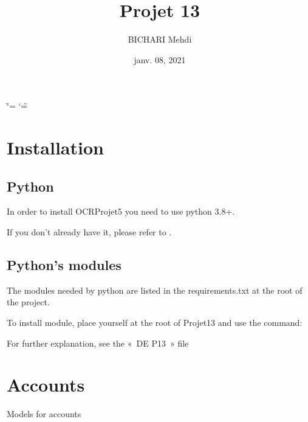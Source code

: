 \documentclass[letterpaper,10pt,french]{sphinxmanual}
\title{Projet 13}
\date{janv. 08, 2021}
\author{BICHARI Mehdi}
\begin{document}
\ifdefined\shorthandoff
  \ifnum\catcode`\=\string=\active\shorthandoff{=}\fi
  \ifnum\catcode`\"=\active{}\fi
\fi

\pagestyle{empty}
\sphinxmaketitle
\pagestyle{plain}
\sphinxtableofcontents
\pagestyle{normal}
\label{\detokenize{index::doc}}



\chapter{Installation}
\label{\detokenize{installation:installation}}\label{\detokenize{installation::doc}}

\section{Python}
\label{\detokenize{installation:python}}
In order to install OCR\sphinxhyphen{}Projet5 you need to use python 3.8+.

If you don’t already have it, please refer to .


\section{Python’s modules}
\label{\detokenize{installation:python-s-modules}}
The modules needed by python are listed in the requirements.txt at the root of the project.

To install module, place yourself at the root of Projet13 and use the command:
\begin{quote}

\end{quote}

For further explanation, see the « DE \sphinxhyphen{} P13 » file


\chapter{Accounts}
\label{\detokenize{accounts:module-accounts.models}}\label{\detokenize{accounts:accounts}}\label{\detokenize{accounts::doc}}
Models for accounts
\end{document}

